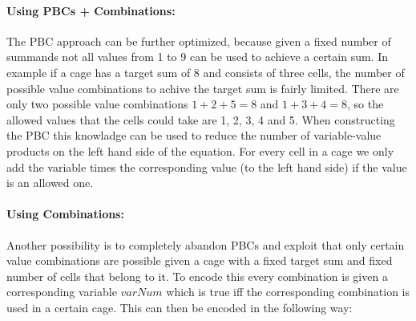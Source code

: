 \paragraph{Using PBCs + Combinations:}
The PBC approach can be further optimized, because given a fixed number of summands not all values from 1 to 9 can be used to achieve a certain sum. In example if a cage has a target sum of 8 and consists of three cells, the number of possible value combinations to achive the target sum is fairly limited. There are only two possible value combinations $1+2+5=8$ and $1+3+4=8$, so the allowed values that the cells could take are 1, 2, 3, 4 and 5. When constructing the PBC this knowladge can be used to reduce the number of variable-value products on the left hand side of the equation. For every cell in a cage we only add the variable times the corresponding value (to the left hand side) if the value is an allowed one.

\paragraph{Using Combinations:}
Another possibility is to completely abandon PBCs and exploit that only certain value combinations are possible given a cage with a fixed target sum and fixed number of cells that belong to it. To encode this every combination is given a corresponding variable $varNum$ which is true iff the corresponding combination is used in a certain cage. This can then be encoded in the following way:\\

